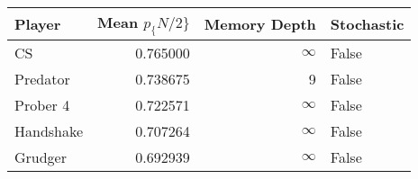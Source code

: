 \begin{tabular}{lrrl}
\toprule
    Player &  Mean $p_\{N/2\}$ &  Memory Depth & Stochastic \\
\midrule
        CS &        0.765000 &            \(\infty\) &      False \\
  Predator &        0.738675 &             9 &      False \\
  Prober 4 &        0.722571 &            \(\infty\) &      False \\
 Handshake &        0.707264 &            \(\infty\) &      False \\
   Grudger &        0.692939 &            \(\infty\) &      False \\
\bottomrule
\end{tabular}
